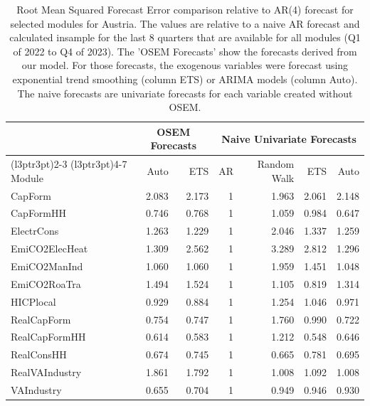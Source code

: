\begin{table}

\caption{\label{tab:rmsfe_AT}Root Mean Squared Forecast Error comparison relative to AR(4) forecast for selected modules for Austria. The values are relative to a naive AR forecast and calculated insample for the last 8 quarters that are available for all modules (Q1 of 2022 to Q4 of 2023). The 'OSEM Forecasts' show the forecasts derived from our model. For those forecasts, the exogenous variables were forecast using exponential trend smoothing (column ETS) or ARIMA models (column Auto). The naive forecasts are univariate forecasts for each variable created without OSEM.}
\centering
\begin{tabular}[t]{lrrrrrr}
\toprule
\multicolumn{1}{c}{ } & \multicolumn{2}{c}{OSEM Forecasts} & \multicolumn{4}{c}{Naive Univariate Forecasts} \\
\cmidrule(l{3pt}r{3pt}){2-3} \cmidrule(l{3pt}r{3pt}){4-7}
Module & Auto & ETS & AR & Random Walk & ETS & Auto\\
\midrule
CapForm & 2.083 & 2.173 & 1 & 1.963 & 2.061 & 2.148\\
CapFormHH & 0.746 & 0.768 & 1 & 1.059 & 0.984 & 0.647\\
ElectrCons & 1.263 & 1.229 & 1 & 2.046 & 1.337 & 1.259\\
EmiCO2ElecHeat & 1.309 & 2.562 & 1 & 3.289 & 2.812 & 1.296\\
EmiCO2ManInd & 1.060 & 1.060 & 1 & 1.959 & 1.451 & 1.048\\
\addlinespace
EmiCO2RoaTra & 1.494 & 1.524 & 1 & 1.105 & 0.819 & 1.314\\
HICPlocal & 0.929 & 0.884 & 1 & 1.254 & 1.046 & 0.971\\
RealCapForm & 0.754 & 0.747 & 1 & 1.760 & 0.990 & 0.722\\
RealCapFormHH & 0.614 & 0.583 & 1 & 1.212 & 0.548 & 0.646\\
RealConsHH & 0.674 & 0.745 & 1 & 0.665 & 0.781 & 0.695\\
\addlinespace
RealVAIndustry & 1.861 & 1.792 & 1 & 1.008 & 1.092 & 1.008\\
VAIndustry & 0.655 & 0.704 & 1 & 0.949 & 0.946 & 0.930\\
\bottomrule
\end{tabular}
\end{table}

\begingroup\fontsize{7}{9}\selectfont

